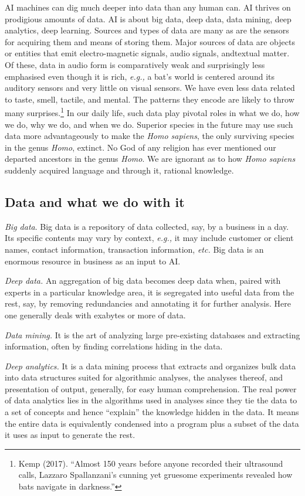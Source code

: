\begin{multicols}{2}
AI machines can dig much deeper into data than any human can. AI thrives on prodigious amounts of data. AI is about big data, deep data, data mining, deep analytics, deep learning. Sources and types of data are many as are the sensors for acquiring them and means of storing them. Major sources of data are objects or entities that emit electro-magnetic signals, audio signals, and\break textual matter. Of these, data in audio form is comparatively weak and surprisingly less emphasised even though it is rich, \textit{e.g.,} a bat's world is centered around its auditory sensors and very little on visual sensors. We have even less data related to taste, smell, tactile, and mental. The patterns they encode are likely to throw many surprises.\footnote{Kemp (2017). “Almost 150 years before anyone recorded their ultrasound calls, Lazzaro Spallanzani's cunning yet gruesome experiments revealed how bats navigate in darkness.”}  In our daily life, such data play pivotal roles in what we do, how we do, why we do, and when we do. Superior species in the future may use such data more advantageously to make the \textit{Homo sapiens}, the only surviving species in the genus \textit{Homo}, extinct. No God of any religion has ever mentioned our departed ancestors in the genus \textit{Homo}. We are ignorant as to how \textit{Homo sapiens} suddenly acquired language and through it, rational knowledge. 

\subsection*{Data and what we do with it}

\textit{Big data}. Big data is a repository of data collected, say, by a business in a day. Its specific contents may vary by context, \textit{e.g.,} it may include customer or client names, contact information, transaction information, \textit{etc.} Big data is an enormous resource in business as an input to AI.

\textit{Deep data.} An aggregation of big data becomes deep data when, paired with experts in a particular knowledge area, it is segregated into useful data from the rest, say, by removing redundancies and annotating it for further analysis. Here one generally deals with exabytes or more of data. 

\textit{Data mining.} It is the art of analyzing large pre-existing databases and extracting information, often by finding correlations hiding in the data.

\textit{Deep analytics.} It is a data mining process that extracts and organizes bulk data into data structures suited for algorithmic analyses, the analyses thereof, and presentation of output, generally, for easy human comprehension. The real power of data analytics lies in the algorithms used in analyses since they tie the data to a set of concepts and hence “explain” the knowledge hidden in the data. It means
the entire data is equivalently condensed into a program plus a subset of the data it uses as input to generate the rest.


\end{multicols}

